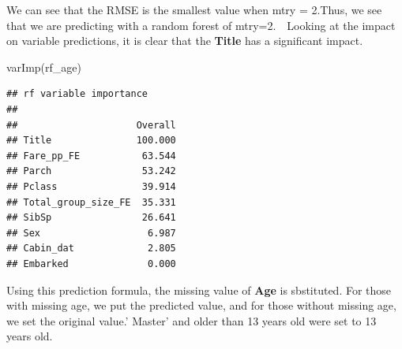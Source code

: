 \documentclass[
]{article}
\newenvironment{Shaded}{\begin{snugshade}}{\end{snugshade}}
\newcommand{\CommentTok}[1]{\textcolor[rgb]{0.56,0.35,0.01}{\textit{#1}}}
\newcommand{\DecValTok}[1]{\textcolor[rgb]{0.00,0.00,0.81}{#1}}
\newcommand{\FunctionTok}[1]{\textcolor[rgb]{0.00,0.00,0.00}{#1}}
\newcommand{\NormalTok}[1]{#1}
\newcommand{\OtherTok}[1]{\textcolor[rgb]{0.56,0.35,0.01}{#1}}
\newcommand{\SpecialCharTok}[1]{\textcolor[rgb]{0.00,0.00,0.00}{#1}}
\newcommand{\StringTok}[1]{\textcolor[rgb]{0.31,0.60,0.02}{#1}}
\begin{document}
We can see that the RMSE is the smallest value when mtry = 2.Thus, we
see that we are predicting with a random forest of mtry=2.　Looking at
the impact on variable predictions, it is clear that the \textbf{Title}
has a significant impact.

\begin{Shaded}
\begin{Highlighting}[]
\FunctionTok{varImp}\NormalTok{(rf\_age)}
\end{Highlighting}
\end{Shaded}

\begin{verbatim}
## rf variable importance
## 
##                     Overall
## Title               100.000
## Fare_pp_FE           63.544
## Parch                53.242
## Pclass               39.914
## Total_group_size_FE  35.331
## SibSp                26.641
## Sex                   6.987
## Cabin_dat             2.805
## Embarked              0.000
\end{verbatim}

Using this prediction formula, the missing value of \textbf{Age} is
sbstituted. For those with missing age, we put the predicted value, and
for those without missing age, we set the original value.' Master' and
older than 13 years old were set to 13 years old.

\begin{Shaded}
\end{Shaded}
\end{document}
